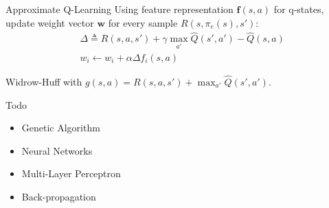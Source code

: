 \documentclass{cognito}
\begin{document}
\begin{note}{Approximate Q-Learning}
	Using feature representation $\mathbf{f}(s,a)$ for q-states, update weight vector $\mathbf{w}$
	for every sample $R(s, \pi_e(s), s')$:
	\begin{align*}
		&\textstyle \Delta \triangleq R(s, a, s') + \gamma \max_{a'} \hat{Q}(s',a') - \hat{Q}(s, a)\\
		&\textstyle w_i \leftarrow w_i + \alpha \Delta f_i(s, a)
	\end{align*}%
	\begin{remark} Widrow-Huff with $g(s,a) = R(s, a, s') + \max_{a'} \hat{Q}(s',a') $.\end{remark}
	\vspace{-5pt}
\end{note}



\begin{question}{Todo}
	\begin{itemize}
		\item Genetic Algorithm
		\item Neural Networks
		\item Multi-Layer Perceptron
		\item Back-propagation
	\end{itemize}
\end{question}


\end{document}
